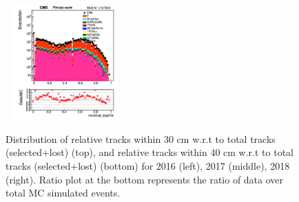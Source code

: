 \documentclass{cernatlasnote}
\begin{document}
\begin{figure}[htp]
 \includegraphics[width=4.6cm, height=4.4cm]{images/emu_channel/2018/18_Range_0pt2_1pt8/track_ntrk40reltot_TRK_Log.png}\\
  \caption{Distribution of relative tracks within 30 cm  w.r.t to total tracks (selected+lost) (top), and relative tracks within 40 cm  w.r.t to total tracks (selected+lost) (bottom)   for 2016 (left), 2017 (middle), 2018 (right). Ratio plot at the bottom represents the ratio of data over total MC simulated events.}
 \label{fig:L0DATAMC}
  \end{figure}
\end{document}
